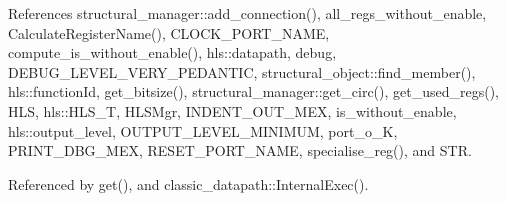 References structural\+\_\+manager\+::add\+\_\+connection(), all\+\_\+regs\+\_\+without\+\_\+enable, Calculate\+Register\+Name(), C\+L\+O\+C\+K\+\_\+\+P\+O\+R\+T\+\_\+\+N\+A\+ME, compute\+\_\+is\+\_\+without\+\_\+enable(), hls\+::datapath, debug, D\+E\+B\+U\+G\+\_\+\+L\+E\+V\+E\+L\+\_\+\+V\+E\+R\+Y\+\_\+\+P\+E\+D\+A\+N\+T\+IC, structural\+\_\+object\+::find\+\_\+member(), hls\+::function\+Id, get\+\_\+bitsize(), structural\+\_\+manager\+::get\+\_\+circ(), get\+\_\+used\+\_\+regs(), H\+LS, hls\+::\+H\+L\+S\+\_\+T, H\+L\+S\+Mgr, I\+N\+D\+E\+N\+T\+\_\+\+O\+U\+T\+\_\+\+M\+EX, is\+\_\+without\+\_\+enable, hls\+::output\+\_\+level, O\+U\+T\+P\+U\+T\+\_\+\+L\+E\+V\+E\+L\+\_\+\+M\+I\+N\+I\+M\+UM, port\+\_\+o\+\_\+K, P\+R\+I\+N\+T\+\_\+\+D\+B\+G\+\_\+\+M\+EX, R\+E\+S\+E\+T\+\_\+\+P\+O\+R\+T\+\_\+\+N\+A\+ME, specialise\+\_\+reg(), and S\+TR.



Referenced by get(), and classic\+\_\+datapath\+::\+Internal\+Exec().

